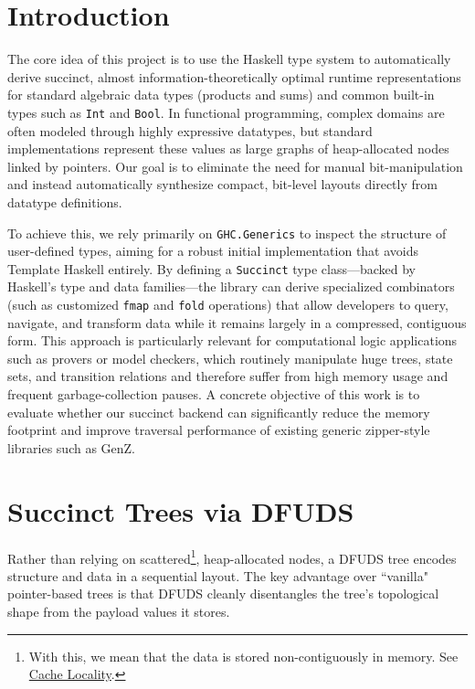 \section{Introduction}

The core idea of this project is to use the Haskell type system to automatically derive succinct, almost information-theoretically optimal runtime representations for standard algebraic data types (products and sums) and common built-in types such as \texttt{Int} and \texttt{Bool}. In functional programming, complex domains are often modeled through highly expressive datatypes, but standard implementations represent these values as large graphs of heap-allocated nodes linked by pointers. Our goal is to eliminate the need for manual bit-manipulation and instead automatically synthesize compact, bit-level layouts directly from datatype definitions.

To achieve this, we rely primarily on \texttt{GHC.Generics} to inspect the structure of user-defined types, aiming for a robust initial implementation that avoids Template Haskell entirely. By defining a \texttt{Succinct} type class—backed by Haskell's type and data families—the library can derive specialized combinators (such as customized \texttt{fmap} and \texttt{fold} operations) that allow developers to query, navigate, and transform data while it remains largely in a compressed, contiguous form. This approach is particularly relevant for computational logic applications such as provers or model checkers, which routinely manipulate huge trees, state sets, and transition relations and therefore suffer from high memory usage and frequent garbage-collection pauses. A concrete objective of this work is to evaluate whether our succinct backend can significantly reduce the memory footprint and improve traversal performance of existing generic zipper-style libraries such as GenZ.

\section{Succinct Trees via DFUDS}

Rather than relying on scattered\footnote{With this, we mean that the data is stored non-contiguously in memory. See \href{https://en.wikipedia.org/wiki/Locality_of_reference}{Cache Locality}.}, heap-allocated nodes, a DFUDS tree encodes structure and data in a sequential layout. The key advantage over ``vanilla" pointer-based trees is that DFUDS cleanly disentangles the tree's topological shape from the payload values it stores.

